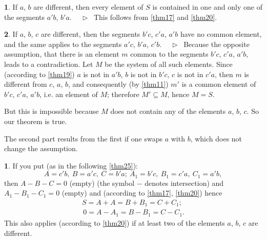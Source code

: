 \documentclass[leqno,hidelinks,10pt]{article}
\theoremstyle{definition}
\newtheorem{satz}{\protect\satzname}
\newtheorem*{zusatz}{\protect\zusatzname}
\newcommand{\satzname}{}
\newcommand{\zusatzname}{}
\renewcommand{\satzname}{\hspace{-4pt}.\ Satz}%
\renewcommand{\zusatzname}{Zusatz}%
\renewcommand{\satzname}{\hspace{-4pt}.\ Theorem}%
\renewcommand{\zusatzname}{Corollary}%
\newcommand\Beweis{\medskip \newline $ \phantom{'.'} \rhd \ $}%
\newcommand{\partof}{\subseteq}
\newcommand{\sref}[1]{\underline{\ref{#1}}}%
\begin{document}
\begin{paracol}{2}
\begin{rightcolumn}
\begin{satz}\label{thm23}
If $a$, $b$ are different, then every element of $S$ is contained in one and only
one of the segments $a'b$, $b'a$.
\Beweis
This follows from \sref{thm17} and \sref{thm20}.
\end{satz}

\begin{satz}\label{thm24}
If $a$, $b$, $c$ are different, then the segments $b'c$, $c'a$, $a'b$ have no
common element, and the same applies to the segments $a'c$, $b'a$, $c'b$.
\Beweis
Because the opposite assumption, that there is an element $m$ common to the segments
$b'c$, $c'a$, $a'b$, leads to a contradiction. Let $M$ be the system of all such
elements. Since (according to \sref{thm19}) $a$ is not in $a'b$, $b$ is not in $b'c$,
$c$ is not in $c'a$, then $m$ is different from $c$, $a$, $b$, and consequently
(by \sref{thm11}) $m'$ is a common element of $b'c$, $c'a$, $a'b$, i.e. an element
of $M$; therefore $M' \partof M$, hence  $M=S$.

But this is impossible because $M$ does not contain any of the elements $a$, $b$,
$c$. So our theorem is true.

The second part results from the first if one swaps $a$ with $b$, which does not
change the assumption.
\end{satz}

\begin{zusatz}\label{corollary1}
If you put (as in the following \sref{thm25}):
\[
    A = c'b,\ B = a'c,\ C = b'a;\  A_1 = b'c,\ B_1 = c'a,\ C_1 = a'b,
\]
then $A - B - C = 0$ (empty) (the symbol $-$ denotes intersection) and
$A_1 - B_1 - C_1 = 0$ (empty) and (according to \sref{thm17}, \sref{thm20}) hence
\begin{gather*}
    S = A + A = B + B_1 = C + C_1; \\
    \,0 = A - A_1 = B - B_1 = C - C_1.
\end{gather*}
This also applies (according to \sref{thm20}) if at least two of the elements
$a$, $b$, $c$ are different.
\end{zusatz}


\end{rightcolumn}
\end{paracol}
\end{document}

